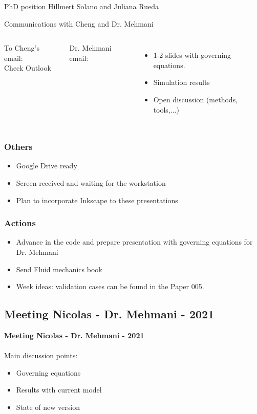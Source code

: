 \documentclass{beamer}
\begin{document}
		\begin{frame}{PhD position}
			Hillmert Solano and Juliana Rueda
		\end{frame}
	
		\begin{frame}{Communications with Cheng and Dr. Mehmani}
			\begin{columns}[T]
				\justifying
				To Cheng's email:\\
				\alert{Check Outlook}
				
				Dr. Mehmani email:
				\begin{itemize}
					\item 1-2 slides with governing equations. 
					\item Simulation results
					\item Open discussion (methods, tools,...)
				\end{itemize}
			\end{columns}
		\end{frame}
	
		\begin{frame}
			\frametitle{Others}
			\begin{itemize}
				\item Google Drive ready
				\item Screen received and waiting for the workstation
				\item Plan to incorporate Inkscape to these presentations
			\end{itemize}
		\end{frame}
	
		\begin{frame}
			\frametitle{Actions}
			\begin{itemize}
				\item Advance in the code and prepare presentation with governing equations for Dr. Mehmani
				\item Send Fluid mechanics book
				
				\item Week ideas: validation cases can be found in the Paper 005.
			\end{itemize}
		\end{frame}
		
		
		\subsection{Meeting Nicolas - Dr. Mehmani - 2021}
		\label{sec:mehmaniOct21}
		\justifying
		\begin{frame}
			\textbf{Meeting Nicolas - Dr. Mehmani - 2021}\\~\\
			Main discussion points:
			\begin{itemize}
				\item Governing equations
				\item Results with current model
				\item State of new version
			\end{itemize}
		\end{frame}
		
\end{document}
